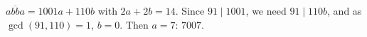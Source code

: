 $\overline{abba}=1001a+110b$ with $2a+2b=14$. Since $91\mid1001$, we need $91\mid110b$, and as $\gcd(91,110)=1$, $b=0$. Then $a=7$: $\boxed{7007}$.
